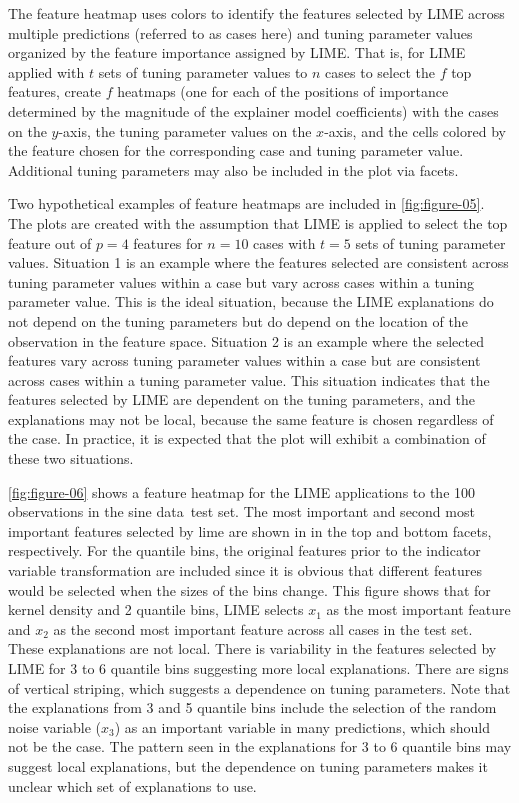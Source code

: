 \documentclass[AMS,STIX2COL]{WileyNJD-v2}\usepackage[]{graphicx}\usepackage[]{color}
\newcommand{\data}{sine data}
\begin{document}
The feature heatmap uses colors to identify the features selected by LIME across multiple predictions (referred to as cases here) and tuning parameter values organized by the  feature importance assigned by LIME. That is, for LIME applied with $t$ sets of tuning parameter values to $n$ cases to select the $f$ top features, create $f$ heatmaps (one for each of the positions of importance determined by the magnitude of the explainer model coefficients) with the cases on the $y$-axis, the tuning parameter values on the $x$-axis, and the cells colored by the feature chosen for the corresponding case and tuning parameter value. Additional tuning parameters may also be included in the plot via facets.

Two hypothetical examples of feature heatmaps are included in \autoref{fig:figure-05}. The plots are created with the assumption that LIME is applied to select the top feature out of $p=4$  features for $n=10$ cases with $t=5$ sets of tuning parameter values. Situation 1 is  an example where the features selected are consistent across tuning parameter values within a case but vary across cases within a tuning parameter value. This is the ideal situation, because the LIME explanations do not depend on the tuning parameters but do depend on the location of the observation in the feature space. Situation 2 is an example where the selected features vary across tuning parameter values within a case but are consistent across cases within a tuning parameter value. This situation indicates that the features selected by LIME are dependent on the tuning parameters, and the explanations may not be  local, because the same feature is chosen regardless of the case. In practice, it is expected that the plot will exhibit a combination of these two situations.

\autoref{fig:figure-06} shows a feature heatmap for the LIME applications to the 100 observations in the \data \ test set. The most important and second most important features selected by lime are shown in in the top and bottom facets, respectively. For the quantile bins, the original features prior to the indicator variable transformation are included since it is obvious that different features would be selected when the sizes of the bins change. This figure shows that for kernel density and 2 quantile bins, LIME selects $x_1$ as the most important feature and $x_2$ as the second most important feature across all cases in the test set. These explanations are not local. There is variability in the features selected by LIME for 3 to 6 quantile bins suggesting more local explanations. There are signs of vertical striping, which suggests a dependence on tuning parameters. Note that the explanations from 3 and 5 quantile bins include the selection of the random noise variable ($x_3$) as an important variable in many predictions, which should not be the case. The pattern seen in the explanations for 3 to 6 quantile bins may suggest local explanations, but the dependence on tuning parameters makes it unclear which set of explanations to use.
\end{document}
